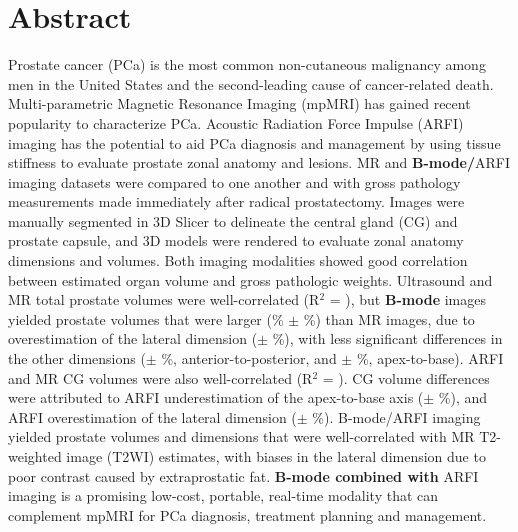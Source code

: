 \section*{Abstract}
Prostate cancer (PCa) is the most common non-cutaneous malignancy among men in
the United States and the second-leading cause of cancer-related death.
Multi-parametric Magnetic Resonance Imaging (mpMRI) has gained recent
popularity to characterize PCa.  Acoustic Radiation Force Impulse (ARFI)
imaging has the potential to aid PCa diagnosis and management by using tissue
stiffness to evaluate prostate zonal anatomy and lesions.  MR and
\textbf{B-mode/}ARFI \invivo imaging datasets were compared to one another and
with gross pathology measurements made immediately after radical prostatectomy.
Images were manually segmented in 3D Slicer to delineate the central gland (CG)
and prostate capsule, and 3D models were rendered to evaluate zonal anatomy
dimensions and volumes.  Both imaging modalities showed good correlation
between estimated organ volume and gross pathologic weights.  Ultrasound and MR
total prostate volumes were well-correlated (R$^2$ = \MRarfiVolTotalRsq), but
\textbf{B-mode} images yielded prostate volumes that were larger
(\MRarfiVolTotalMeanDiff\% $\pm$ \MRarfiVolTotalStdDiff\%) than MR images, due
to overestimation of the lateral dimension (\ARFImrTotalLatLatMeanPct $\pm$
\ARFImrTotalLatLatStdPct\%), with less significant differences in the other
dimensions (\ARFImrTotalAntPostMeanPct $\pm$ \ARFImrTotalAntPostStdPct\%,
anterior-to-posterior, and \ARFImrTotalApexBaseMeanPct $\pm$
\ARFImrTotalApexBaseStdPct\%, apex-to-base).  ARFI and MR CG volumes were also
well-correlated (R$^2$ = \MRarfiVolCentralRsq).  CG volume differences were
attributed to ARFI underestimation of the apex-to-base axis
(\ARFImrCentralApexBaseMeanPct $\pm$ \ARFImrCentralApexBaseStdPct\%), and ARFI
overestimation of the lateral dimension (\ARFImrCentralLatLatMeanPct $\pm$
\ARFImrCentralLatLatStdPct\%).  B-mode/ARFI imaging yielded prostate volumes
and dimensions that were well-correlated with MR T2-weighted image (T2WI)
estimates, with biases in the lateral dimension due to poor contrast caused by
extraprostatic fat.  \textbf{B-mode combined with} ARFI imaging is a promising
low-cost, portable, real-time modality that can complement mpMRI for PCa
diagnosis, treatment planning and management.
